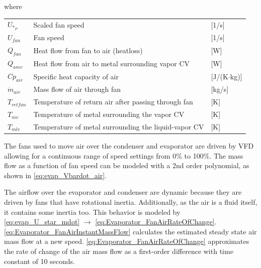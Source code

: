 where

\begin{center}
	\begin{tabular}{l p{10cm} l}
		$U_{*_P}$    	& Scaled fan speed                                    & [1/\si{s}]                        \\
		$U_{fan}$       & Fan speed                                           & [1/\si{s}]                        \\
		$Q_{fan}$       & Heat flow from fan to air (heatloss)                & [\si{W}]                          \\
		$Q_{amv}$       & Heat flow from air to metal surrounding vapor CV    & [\si{W}]                          \\
		$Cp_{air}$      & Specific heat capacity of air                       & [\si{J}/(\si{K}$ \cdot $\si{kg})] \\
		$\dot{m}_{air}$ & Mass flow of air through fan                        & [\si{kg}/\si{s}]                  \\
		$T_{retfan}$    & Temperature of return air after passing through fan & [\si{K}]                          \\
		$T_{mv}$        & Temperature of metal surrounding the vapor CV                & [\si{K}]\\
		$T_{mlv}$       & Temperature of metal surrounding the liquid-vapor CV & [\si{K}]
	\end{tabular}
\end{center}

The fans used to move air over the condenser and evaporator are driven by VFD allowing for a continuous range of speed settings from 0\% to 100\%. The mass flow as a function of fan speed can be modeled with a 2nd order polynomial, as shown in \cref{eq:evap_Vbardot_air}.

The airflow over the evaporator and condenser are dynamic because they are driven by fans that have rotational inertia. Additionally, as the air is a fluid itself, it contains some inertia too. This behavior is modeled by \cref{eq:evap_U_star_mdot} $\rightarrow$ \cref{eq:Evaporator_FanAirRateOfChange}. \cref{eq:Evaporator_FanAirInstantMassFlow} calculates the estimated steady state air mass flow at a new speed. \cref{eq:Evaporator_FanAirRateOfChange} approximates the rate of change of the air mass flow as a first-order difference with time constant of 10 seconds.

